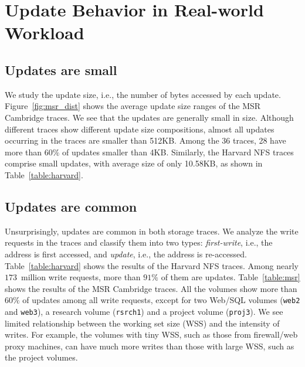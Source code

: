 \section{Update Behavior in Real-world Workload}


\subsection{Updates are small}  We study the update size, i.e., the number of
bytes accessed by each update.  Figure~\ref{fig:msr_dist} shows the average
update size ranges of the MSR Cambridge traces.  We see that the updates are
generally small in size. Although different traces show different
update size compositions, almost all updates occurring in the traces are smaller than
512KB. Among the 36 traces, 28 have more than $60\%$ of updates
smaller than 4KB. Similarly, the Harvard NFS traces comprise small updates,
with average size of only 10.58KB, as shown in Table~\ref{table:harvard}.

\subsection{Updates are common} Unsurprisingly, updates are common in both
storage traces.  We analyze the write requests in the traces and classify them
into two types: {\em first-write}, i.e., the address is first accessed, and
{\em update}, i.e., the address is re-accessed.  Table~\ref{table:harvard}
shows the results of the Harvard NFS traces.  Among nearly $173$~million
write requests, more than $91\%$ of them are updates.  Table~\ref{table:msr}
shows the results of the MSR Cambridge traces. All the volumes show more than
$60\%$ of updates among all write requests, except for two Web/SQL volumes
(\texttt{web2} and \texttt{web3}), a research volume (\texttt{rsrch1}) and a
project volume (\texttt{proj3}). We see limited relationship between 
the working set size (WSS) and the intensity of writes.  For example, the
volumes with tiny WSS, such as those from firewall/web proxy machines, can
have much more writes than those with large WSS, such as the project volumes.  


